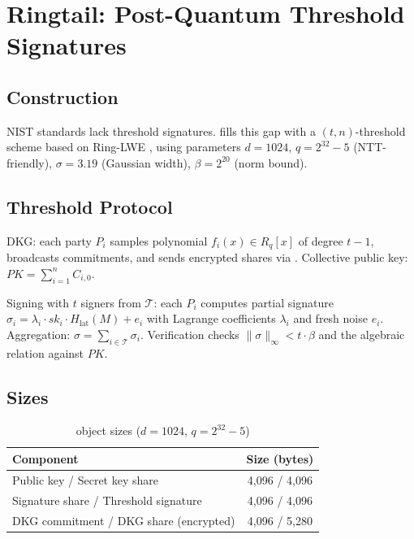 \section{Ringtail: Post-Quantum Threshold Signatures}


\subsection{Construction}

NIST standards lack threshold signatures. \Ringtail{} fills this gap with a $(t, n)$-threshold scheme based on Ring-LWE \cite{lyubashevsky2010ideal, lux-ringtail-pq}, using parameters $d = 1024$, $q = 2^{32} - 5$ (NTT-friendly), $\sigma = 3.19$ (Gaussian width), $\beta = 2^{20}$ (norm bound).

\subsection{Threshold Protocol}

DKG: each party $P_i$ samples polynomial $f_i(x) \in R_q[x]$ of degree $t - 1$, broadcasts commitments, and sends encrypted shares via \MLKEM{}. Collective public key: $PK = \sum_{i=1}^{n} C_{i,0}$.

Signing with $t$ signers from $\mathcal{T}$: each $P_i$ computes partial signature $\sigma_i = \lambda_i \cdot sk_i \cdot H_{\text{lat}}(M) + e_i$ with Lagrange coefficients $\lambda_i$ and fresh noise $e_i$. Aggregation: $\sigma = \sum_{i \in \mathcal{T}} \sigma_i$. Verification checks $\|\sigma\|_\infty < t \cdot \beta$ and the algebraic relation against $PK$.

\subsection{Sizes}

\begin{table}[h]
\centering
\begin{tabular}{lc}
\toprule
\textbf{Component} & \textbf{Size (bytes)} \\
\midrule
Public key / Secret key share & 4,096 / 4,096 \\
Signature share / Threshold signature & 4,096 / 4,096 \\
DKG commitment / DKG share (encrypted) & 4,096 / 5,280 \\
\bottomrule
\end{tabular}
\caption{\Ringtail{} object sizes ($d = 1024$, $q = 2^{32} - 5$)}
\label{tab:ringtail-sizes}
\end{table}

